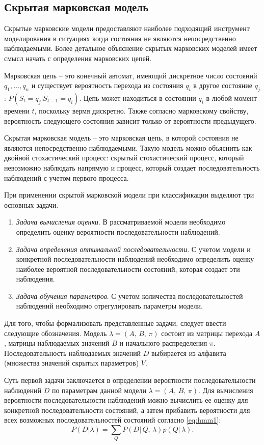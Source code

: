 \subsection{Скрытая марковская модель}

Скрытые марковские модели предоставляют наиболее подходящий инструмент моделирования в ситуациях когда состояния не являются непосредственно наблюдаемыми. Более детальное объяснение скрытых марковских моделей имеет смысл начать с определения марковских цепей.

Марковская цепь -- это конечный автомат, имеющий дискретное число состояний $q_1, \dots, q_n$ и существует вероятность перехода из состояния $q_i$ в другое состояние $q_j$: $P\left(S_t = q_j | S_{t - 1} = q_i\right)$. Цепь может находиться в состоянии $q_i$ в любой момент времени $t$, поскольку вермя дискретно. Также согласно марковскому свойству, вероятность следующего состояния зависит только от вероятности предыдущего.

Скрытая марковская модель -- это марковская цепь, в которой состояния не являются непосредственно наблюдаемыми. Такую модель можно объяснить как двойной  стохастический процесс: скрытый стохастический процесс, который невозможно наблюдать напрямую и процесс, который создает последовательность наблюдений с учетом первого процесса.

При применении скрытой марковской модели при классификации выделяют три основных задачи. 
\begin{enumerate}
	\item \textit{Задача вычисления оценки}. В рассматриваемой модели необходимо определить оценку вероятности последовательности наблюдений.
	\item \textit{Задача определения оптимальной последовательности}. С учетом модели и конкретной последовательности наблюдений необходимо определить оценку наиболее вероятной последовательности состояний, которая создает эти 	наблюдения.
	\item \textit{Задача обучения параметров}. С учетом количества последовательностей наблюдений необходимо отрегулировать параметры модели.
\end{enumerate}
Для того, чтобы формализовать представленные задачи, следует ввести следующие обозначения. Модель $\lambda = (A,\,B,\,\pi)$ состоит из матрицы перехода $A$, матрицы наблюдаемых значений $B$ и начального распределения $\pi$. Последовательность наблюдаемых значений $D$ выбирается из алфавита (множества значений скрытых параметров) $V$.

Суть первой задачи заключается в определении вероятности последовательности наблюдений $D$ по параметрам данной модели $\lambda = (A,\,B,\,\pi)$. Для вычисления вероятности последовательности наблюдений можно вычислить ее оценку для конкретной последовательности состояний, а затем прибавить вероятности для всех возможных последовательностей состояний согласно \ref{eq:hmm1}:
\begin{equation}\label{eq:hmm1}
	P(D|\lambda) = \sum_{Q}P(D|\,Q,\,\lambda)p(Q|\,\lambda).
\end{equation}

